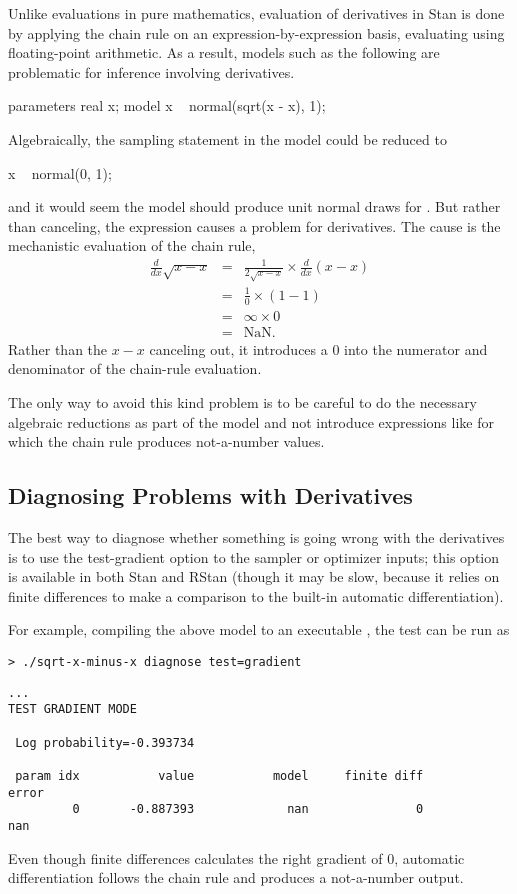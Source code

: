 Unlike evaluations in pure mathematics, evaluation of derivatives in
Stan is done by applying the chain rule on an expression-by-expression
basis, evaluating using floating-point arithmetic.  As a result,
models such as the following are problematic for inference involving
derivatives.
%
\begin{stancode}
parameters {
  real x;
}
model {
  x ~ normal(sqrt(x - x), 1);
}
\end{stancode}
%
Algebraically, the sampling statement in the model could be reduced to
%
\begin{stancode}
  x ~ normal(0, 1);
\end{stancode}
%
and it would seem the model should produce unit normal draws for
.  But rather than canceling, the expression  causes a problem for derivatives.  The cause is the mechanistic
evaluation of the chain rule,
%
\begin{eqnarray*}
\frac{d}{dx} \sqrt{x - x}
& = &
\frac{1}{2 \sqrt{x - x}} \times \frac{d}{dx} (x - x)
\\[4pt]
& = &
\frac{1}{0} \times (1 - 1)
\\[4pt]
& = &
\infty \times 0
\\[4pt]
& = & \mbox{NaN}.
\end{eqnarray*}
%
Rather than the $x - x$ canceling out, it introduces a 0 into the
numerator and denominator of the chain-rule evaluation.

The only way to avoid this kind problem is to be careful to do the
necessary algebraic reductions as part of the model and not introduce
expressions like  for which the chain rule produces
not-a-number values.

\subsection{Diagnosing Problems with Derivatives}

The best way to diagnose whether something is going wrong with the
derivatives is to use the test-gradient option to the sampler or
optimizer inputs; this option is available in both Stan and RStan
(though it may be slow, because it relies on finite differences to
make a comparison to the built-in automatic differentiation).

For example, compiling the above model to an executable
, the test can be run as
%
\begin{Verbatim}
> ./sqrt-x-minus-x diagnose test=gradient
\end{Verbatim}
\begin{Verbatim}[fontsize=\small]
...
TEST GRADIENT MODE

 Log probability=-0.393734

 param idx           value           model     finite diff           error
         0       -0.887393             nan               0             nan
\end{Verbatim}
%
Even though finite differences calculates the right gradient of 0,
automatic differentiation follows the chain rule and produces a
not-a-number output.



